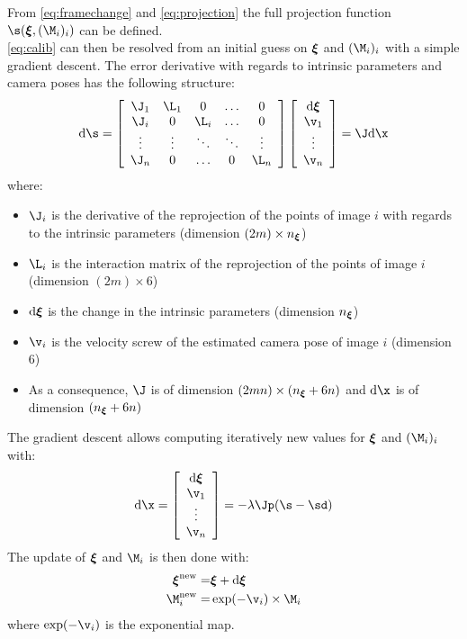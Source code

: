\documentclass{ecnreport}
\begin{document}
From \eqref{eq:framechange} and \eqref{eq:projection} the full projection function $\s(\xii, (\M_i)_i)$ can be defined.\\ 

\eqref{eq:calib} can then be resolved from an initial guess on ${\boldsymbol{\xi}}$ and $(\M_i)_i$ with a simple gradient descent. 
The error derivative with regards to intrinsic parameters and camera poses has the following structure:
\newcommand{\der}{\text{d}}
\begin{equation}\label{eq:jacob}
 \der\s =  \left[\begin{array}{ccccc}
           \J_1 & \L_1 &  0 &  \hdots & 0 \\ 
           \J_i & 0 & \L_i &  \hdots & 0 \\
           \vdots& \vdots & \ddots & \ddots & \vdots\\
           \J_n & 0 & \hdots & 0 & \L_n
            \end{array}\right]
            \left[\begin{array}{c}\der\xii \\ \v_1 \\ \vdots \\ \v_n\end{array}\right]
             = \J\der\x
\end{equation}
where:
\begin{itemize}
\item $\J_i$ is the derivative of the reprojection of the points of image $i$ with regards to the intrinsic parameters (dimension $(2m)\times n_{\boldsymbol{\xi}}$)
 \item $\L_i$ is the interaction matrix of the reprojection of the points of image $i$ (dimension $(2m)\times 6$)
 \item $\der\xii$ is the change in the intrinsic parameters (dimension $n_{\boldsymbol{\xi}}$) 
 \item $\v_i$ is the velocity screw of the estimated camera pose of image $i$ (dimension $6$)
 \item As a consequence, $\J$ is of dimension $(2mn)\times (n_{\boldsymbol{\xi}}+6n)$ and $\der\x$ is of dimension  $(n_{\boldsymbol{\xi}}+6n)$
\end{itemize}
The gradient descent allows computing iteratively new values for ${\boldsymbol{\xi}}$ and $(\M_i)_i$ with:
\begin{equation}
 \der\x = \left[\begin{array}{c}\der\xii \\ \v_1 \\ \vdots \\ \v_n\end{array}\right] = -\lambda\Jp(\s - \sd)
\end{equation}
The update of ${\boldsymbol{\xi}}$ and $\M_i$ is then done with:
\begin{eqnarray}
 \xii^{\text{new}} =& \xii + \der\xii \label{upd:xi}\\
 \M_i^{\text{new}} =& \exp(-\v_i)\times\M_i \label{upd:M}
\end{eqnarray}
where $\exp(-\v_i)$ is the exponential map.\\
\end{document}
